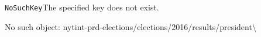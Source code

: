 \texttt{NoSuchKey}The specified key does not exist.

No such object:
nytint-prd-elections/elections/2016/results/president\textbackslash{}
